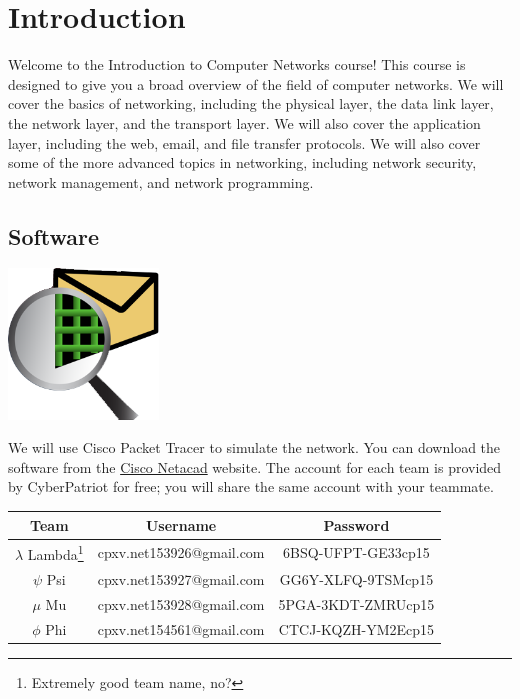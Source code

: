 \section{Introduction}

Welcome to the Introduction to Computer Networks course! This course is
designed to give you a broad overview of the field of computer networks. We
will cover the basics of networking, including the physical layer, the data
link layer, the network layer, and the transport layer. We will also cover the
application layer, including the web, email, and file transfer protocols. We
will also cover some of the more advanced topics in networking, including
network security, network management, and network programming.

\subsection{Software}

\begin{center}
    \includegraphics[width=0.3\textwidth]{images/packet_tracer.png}
\end{center}

We will use Cisco Packet Tracer to simulate the network. You can download the
software from the \href{http://www.netacad.com}{Cisco Netacad} website. The
account for each team is provided by CyberPatriot for free; you will share the
same account with your teammate.

\begin{longtable}{ccc}
    \toprule
    Team                                                     & Username                 & Password           \\
    \midrule
    $\lambda$ Lambda\footnote{Extremely good team name, no?} & cpxv.net153926@gmail.com & 6BSQ-UFPT-GE33cp15 \\
    $\psi$ Psi                                               & cpxv.net153927@gmail.com & GG6Y-XLFQ-9TSMcp15 \\
    $\mu$ Mu                                                 & cpxv.net153928@gmail.com & 5PGA-3KDT-ZMRUcp15 \\
    $\phi$ Phi                                               & cpxv.net154561@gmail.com & CTCJ-KQZH-YM2Ecp15 \\
    \bottomrule
\end{longtable}

